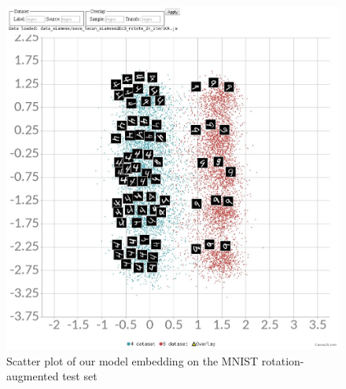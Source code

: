 \documentclass[a4paper,12pt]{report}
\begin{document}
\begin{figure}[h]
    \begin{center}
        \includegraphics{thesis_figures/mnist_cl2d_rotate.jpg}
    \end{center}
    \caption{Scatter plot of our model embedding on the MNIST rotation-augmented test set}
    \label{fig:mnist_cl2d_rotate}
\end{figure}
\end{document}
